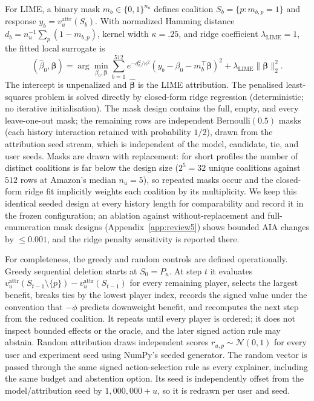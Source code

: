 \documentclass[pdflatex,sn-mathphys-num]{sn-jnl}
\theoremstyle{thmstyleone}
\theoremstyle{thmstyletwo}
\theoremstyle{thmstylethree}
\begin{document}
For LIME, a binary mask $m_b\in\{0,1\}^{n_u}$ defines coalition $S_b=\{p:m_{b,p}=1\}$ and response $y_b=v_u^{\mathrm{attr}}(S_b)$. With normalized Hamming distance $d_b=n_u^{-1}\sum_p(1-m_{b,p})$, kernel width $\kappa=.25$, and ridge coefficient $\lambda_{\mathrm{LIME}}=1$, the fitted local surrogate is
\begin{equation}
(\hat\beta_0,\hat{\boldsymbol\beta})=\arg\min_{\beta_0,\boldsymbol\beta}
\sum_{b=1}^{512}e^{-d_b^2/\kappa^2}\left(y_b-\beta_0-m_b^{\top}\boldsymbol\beta\right)^2
+\lambda_{\mathrm{LIME}}\lVert\boldsymbol\beta\rVert_2^2.
\label{eq:lime}
\end{equation}
The intercept is unpenalized and $\hat{\boldsymbol\beta}$ is the LIME attribution. The penalised least-squares problem is solved directly by closed-form ridge regression (deterministic; no iterative initialisation). The mask design contains the full, empty, and every leave-one-out mask; the remaining rows are independent Bernoulli$(0.5)$ masks (each history interaction retained with probability $1/2$), drawn from the attribution seed stream, which is independent of the model, candidate, tie, and user seeds. Masks are drawn with replacement: for short profiles the number of distinct coalitions is far below the design size ($2^5=32$ unique coalitions against $512$ rows at Amazon's median $n_u=5$), so repeated masks occur and the closed-form ridge fit implicitly weights each coalition by its multiplicity. We keep this identical seeded design at every history length for comparability and record it in the frozen configuration; an ablation against without-replacement and full-enumeration mask designs (Appendix~\ref{app:review5}) shows bounded AIA changes by $\le0.001$, and the ridge penalty sensitivity is reported there.

For completeness, the greedy and random controls are defined operationally. Greedy sequential deletion starts at $S_0=P_u$. At step $t$ it evaluates $v_u^{\mathrm{attr}}(S_{t-1}\setminus\{p\})-v_u^{\mathrm{attr}}(S_{t-1})$ for every remaining player, selects the largest benefit, breaks ties by the lowest player index, records the signed value under the convention that $-\phi$ predicts downweight benefit, and recomputes the next step from the reduced coalition. It repeats until every player is ordered; it does not inspect bounded effects or the oracle, and the later signed action rule may abstain. Random attribution draws independent scores $r_{u,p}\sim\mathcal{N}(0,1)$ for every user and experiment seed using NumPy's seeded generator. The random vector is passed through the same signed action-selection rule as every explainer, including the same budget and abstention option. Its seed is independently offset from the model/attribution seed by $1{,}000{,}000+u$, so it is redrawn per user and seed.
\end{document}
